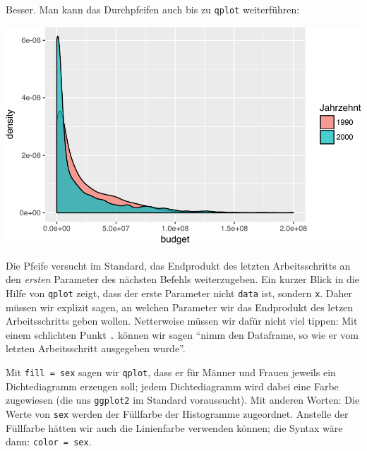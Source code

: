 \documentclass[12pt,ngerman,]{book}
\newenvironment{Shaded}{\begin{snugshade}}{\end{snugshade}}
\newcommand{\KeywordTok}[1]{\textcolor[rgb]{0.13,0.29,0.53}{\textbf{{#1}}}}
\newcommand{\DataTypeTok}[1]{\textcolor[rgb]{0.13,0.29,0.53}{{#1}}}
\newcommand{\DecValTok}[1]{\textcolor[rgb]{0.00,0.00,0.81}{{#1}}}
\newcommand{\StringTok}[1]{\textcolor[rgb]{0.31,0.60,0.02}{{#1}}}
\newcommand{\NormalTok}[1]{{#1}}
\renewenvironment{Shaded}{\begin{kframe}}{\end{kframe}}
\begin{document}
Besser. Man kann das Durchpfeifen auch bis zu \texttt{qplot}
weiterführen:

\begin{Shaded}
\end{Shaded}

\begin{center}\includegraphics[width=0.7\linewidth]{050_Daten_visualisieren_files/figure-latex/unnamed-chunk-11-1} \end{center}

Die Pfeife versucht im Standard, das Endprodukt des letzten
Arbeitsschritts an den \emph{ersten} Parameter des nächsten Befehls
weiterzugeben. Ein kurzer Blick in die Hilfe von \texttt{qplot} zeigt,
dass der erste Parameter nicht \texttt{data} ist, sondern \texttt{x}.
Daher müssen wir explizit sagen, an welchen Parameter wir das Endprodukt
des letzen Arbeitsschritts geben wollen. Netterweise müssen wir dafür
nicht viel tippen: Mit einem schlichten Punkt \texttt{.} können wir
sagen ``nimm den Dataframe, so wie er vom letzten Arbeitsschritt
ausgegeben wurde''.

Mit \texttt{fill\ =\ sex} sagen wir \texttt{qplot}, dass er für Männer
und Frauen jeweils ein Dichtediagramm erzeugen soll; jedem
Dichtediagramm wird dabei eine Farbe zugewiesen (die uns
\texttt{ggplot2} im Standard voraussucht). Mit anderen Worten: Die Werte
von \texttt{sex} werden der Füllfarbe der Histogramme zugeordnet.
Anstelle der Füllfarbe hätten wir auch die Linienfarbe verwenden können;
die Syntax wäre dann: \texttt{color\ =\ sex}.
\end{document}
